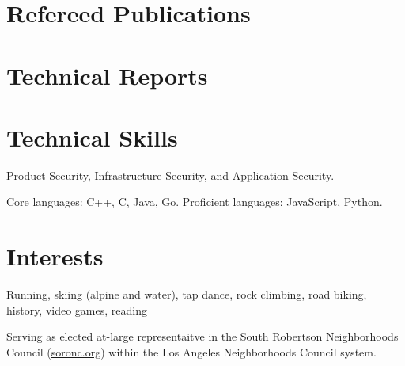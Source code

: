 \documentclass[a4paper,12pt]{article}
\begin{document}
\section{Refereed Publications}
\begin{refsection}
\nocite{*}
\printbibliography[heading=none]
\end{refsection}

\section{Technical Reports}
\begin{refsection}
\nocite{*}
\printbibliography[heading=none]
\end{refsection}


\section{Technical Skills}
Product Security, Infrastructure Security, and Application Security.

Core languages: C++, C, Java, Go. Proficient languages: JavaScript, Python.

\section{Interests}
Running, skiing (alpine and water), tap dance, rock climbing, road biking, history, video games, reading

Serving as elected at-large representaitve in the South Robertson Neighborhoods Council (\href{https://www.soronc.org}{soronc.org}) within the Los Angeles Neighborhoods Council system.
\end{document}
